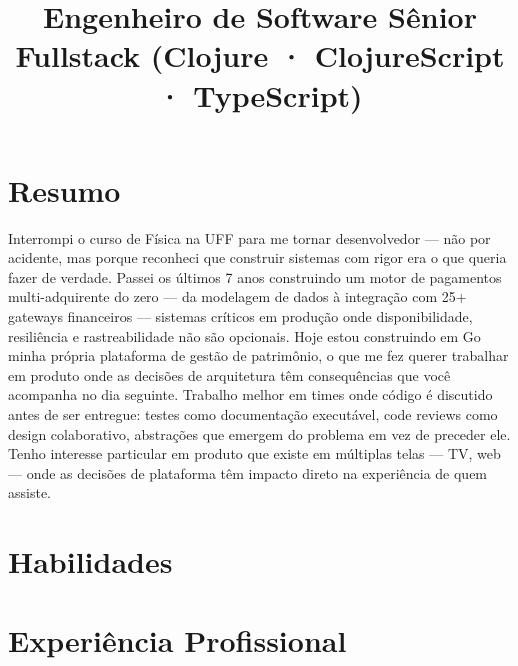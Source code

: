 \documentclass[10pt,a4paper,sans]{moderncv}
\title{Engenheiro de Software Sênior Fullstack (Clojure · ClojureScript · TypeScript)}
\begin{document}
\makecvtitle

\section{Resumo}
Interrompi o curso de Física na UFF para me tornar desenvolvedor --- não por acidente, mas porque reconheci que construir sistemas com rigor era o que queria fazer de verdade. Passei os últimos 7 anos construindo um motor de pagamentos multi-adquirente do zero --- da modelagem de dados à integração com 25+ gateways financeiros --- sistemas críticos em produção onde disponibilidade, resiliência e rastreabilidade não são opcionais. Hoje estou construindo em Go minha própria plataforma de gestão de patrimônio, o que me fez querer trabalhar em produto onde as decisões de arquitetura têm consequências que você acompanha no dia seguinte. Trabalho melhor em times onde código é discutido antes de ser entregue: testes como documentação executável, code reviews como design colaborativo, abstrações que emergem do problema em vez de preceder ele. Tenho interesse particular em produto que existe em múltiplas telas --- TV, web --- onde as decisões de plataforma têm impacto direto na experiência de quem assiste.

\section{Habilidades}

\section{Experiência Profissional}
\end{document}
